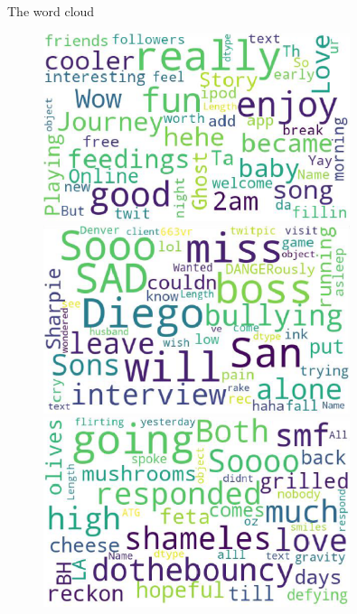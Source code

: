 \documentclass[
 size=14pt,
 paper=smartboard,  %
 mode=present, 		%
 display=slides, 	%
 style=tuliplab,  	%
 pauseslide,
 fleqn,leqno]{powerdot}
\begin{document}
\begin{slide}{The word cloud}
  
  \begin{figure}[htbp]
    \centering
    \begin{minipage}[t]{0.48\textwidth}
      \centering
      \includegraphics[width=0.8\textwidth]{kaggle/1.4.eps}
      \vspace{0.4em}
      \caption{}
    \end{minipage}
    \begin{minipage}[t]{0.48\textwidth}
      \centering
      \includegraphics[width=0.8\textwidth]{kaggle/1.5.eps}
      \vspace{0.4em}
      \caption{}
    \end{minipage}
    \begin{minipage}[t]{0.48\textwidth}
      \centering
      \includegraphics[width=0.8\textwidth]{kaggle/1.6.eps}
      \vspace{0.4em}
      \caption{}
    \end{minipage}
  \end{figure}
\end{slide}
\end{document}
